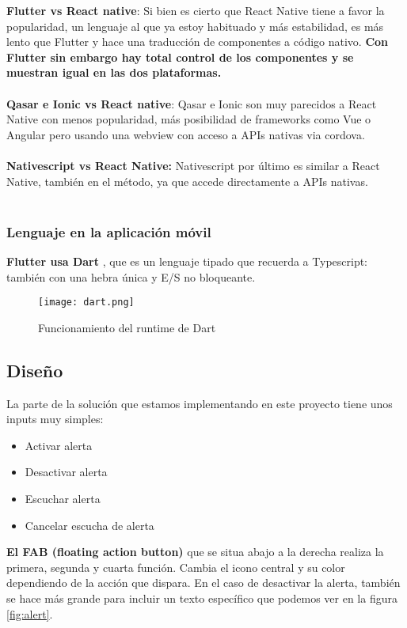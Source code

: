 \textbf{Flutter vs React native}: Si bien es cierto que React Native tiene a favor la popularidad, un lenguaje al que ya estoy habituado y más estabilidad, es más lento que Flutter y hace una traducción de componentes a código nativo.
\textbf{Con Flutter sin embargo hay total control de los componentes y se muestran igual en las dos plataformas.} \\ \\

\textbf{Qasar e Ionic vs React native}: Qasar e Ionic son muy parecidos a React Native con menos popularidad, más posibilidad de frameworks como Vue o Angular pero usando 
una webview con acceso a APIs nativas via cordova. \\ \\

\textbf{Nativescript vs React Native:} Nativescript por último es similar a React Native, también en el método, ya que accede directamente a APIs nativas. \\ \\

\subsubsection{Lenguaje en la aplicación móvil}
\textbf{Flutter usa Dart} \cite{dart}, que es un lenguaje tipado que recuerda a Typescript: también con una hebra única y E/S no bloqueante.

\begin{figure}[H]
	\centering	
	\texttt{[image: dart.png]}
	\caption{Funcionamiento del runtime de Dart}
	\end{figure}

\subsection{Diseño}
La parte de la solución que estamos implementando en este proyecto tiene unos inputs muy simples:
\begin{itemize}
	\item Activar alerta
	\item Desactivar alerta
	\item Escuchar alerta
	\item Cancelar escucha de alerta
\end{itemize}

\textbf{El FAB (floating action button)} que se situa abajo a la derecha realiza la primera, segunda y cuarta función. 
Cambia el icono central y su color dependiendo de la acción que dispara. En el caso de desactivar la alerta,
también se hace más grande para incluir un texto específico que podemos ver en la figura \ref{fig:alert}.


